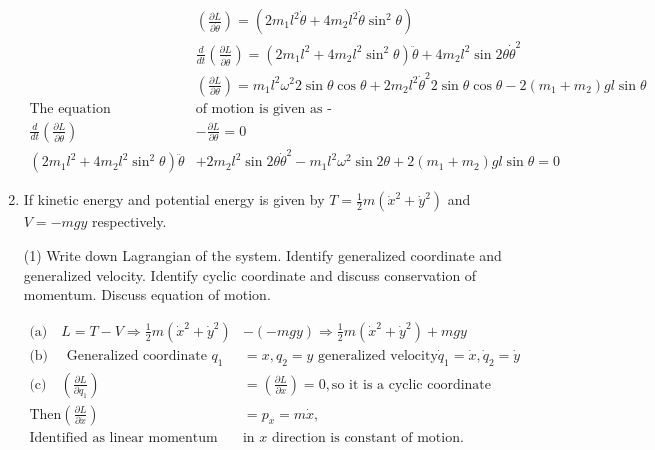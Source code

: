 \begin{enumerate}
\begin{answer}
\begin{align*}
		&\left(\frac{\partial L}{\partial \dot{\theta}}\right)=\left(2 m_{1} l^{2} \dot{\theta}+4 m_{2} l^{2} \dot{\theta} \sin ^{2} \theta\right) \\
		&\frac{d}{d t}\left(\frac{\partial L}{\partial \dot{\theta}}\right)=\left(2 m_{1} l^{2}+4 m_{2} l^{2} \sin ^{2} \theta\right) \ddot{\theta}+4 m_{2} l^{2} \sin 2 \theta \dot{\theta}^{2} \\
		&\left(\frac{\partial L}{\partial \theta}\right)=m_{1} l^{2} \omega^{2} 2 \sin \theta \cos \theta+2 m_{2} l^{2} \dot{\theta}^{2} 2 \sin \theta \cos \theta-2\left(m_{1}+m_{2}\right) g l \sin \theta\\
		\text{The equation }&\text{of  motion is given as -}\\
		\frac{d}{d t}\left(\frac{\partial L}{\partial \dot{\theta}}\right)&-\frac{\partial L}{\partial \theta}=0\\
		\left(2 m_{1} l^{2}+4 m_{2} l^{2} \sin ^{2} \theta\right) \ddot{\theta}&+2 m_{2} l^{2} \sin 2 \theta \dot{\theta}^{2}-m_{1} l^{2} \omega^{2} \sin 2 \theta+2\left(m_{1}+m_{2}\right) g l \sin \theta=0
		\end{align*}
	\end{answer}
	\item 
		If kinetic energy and potential energy is given by $T=\frac{1}{2} m\left(\dot{x}^{2}+\dot{y}^{2}\right)$ and $V=-m g y$ respectively.
		\begin{tasks}(1)
			\task[\textbf{a.}] Write down Lagrangian of the system.
			\task[\textbf{b.}] Identify generalized coordinate and generalized velocity.
			\task[\textbf{c.}] Identify cyclic coordinate and discuss conservation of momentum.
			\task[\textbf{d.}]  Discuss equation of motion.
		\end{tasks}
	\begin{answer}
		\begin{align*}
		\text{(a)}\quad L=T-V \Rightarrow \frac{1}{2} m\left(\dot{x}^{2}+\dot{y}^{2}\right)&-(-m g y) \Rightarrow \frac{1}{2} m\left(\dot{x}^{2}+\dot{y}^{2}\right)+m g y\\
		\text{(b)}\quad \text{ Generalized coordinate }q_{1}&=x, q_{2}=y\text{ generalized velocity} \dot{q}_{1}=\dot{x}, \dot{q}_{2}=\dot{y}\\
		\text{(c)} \quad\left(\frac{\partial L}{\partial q_{1}}\right)&=\left(\frac{\partial L}{\partial x}\right)=0, \text{so it is a cyclic coordinate}\\ 
		\text{Then} \left(\frac{\partial L}{\partial \dot{x}}\right)&=p_{x}=m \dot{x}, \\
		\text{Identified as linear momentum }&\text{in $x$ direction is constant of motion.}\\

\end{align*}
\end{answer}
\end{enumerate}
